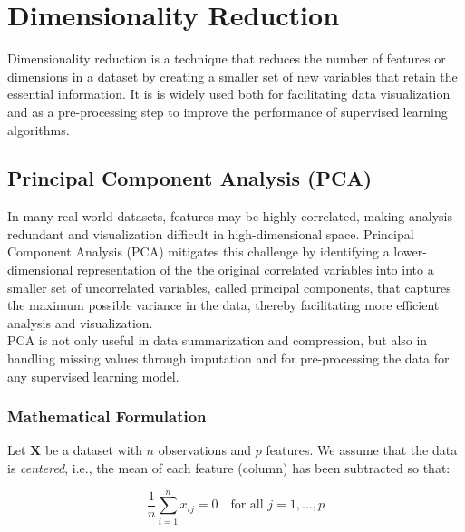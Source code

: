 \documentclass[conference]{IEEEtran}
\begin{document}
\section{Dimensionality Reduction}
Dimensionality reduction is a technique that reduces the number of features or dimensions in a dataset by creating a smaller set of new variables that retain the essential information. It is is widely used both for facilitating data visualization and as a pre-processing step to improve the performance of supervised learning algorithms.
\subsection{Principal Component Analysis (PCA)}
In many real-world datasets, features may be highly correlated, making analysis redundant and visualization difficult in high-dimensional space. Principal Component Analysis (PCA) mitigates this challenge by identifying a lower-dimensional representation of the the original correlated variables into into a smaller set of uncorrelated variables, called principal components, that captures the maximum possible variance in the data, thereby facilitating more efficient analysis and visualization. \\

PCA is not only useful in data summarization and compression, but also in handling missing values through imputation and for pre-processing the data for any supervised learning model. 

\subsubsection{Mathematical Formulation}

Let \( \mathbf{X} \) be a dataset with \( n \) observations and \( p \) features. We assume that the data is \textit{centered}, i.e., the mean of each feature (column) has been subtracted so that:

\[
\frac{1}{n} \sum_{i=1}^{n} x_{ij} = 0 \quad \text{for all } j = 1, \dots, p
\]
\end{document}

